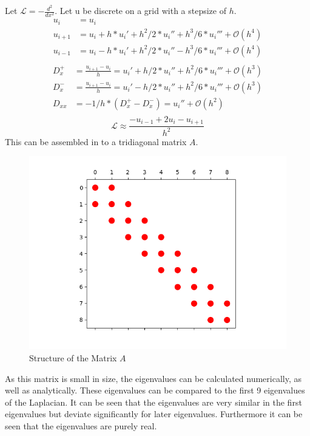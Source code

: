 \documentclass{article}
\begin{document}
Let $\mathcal{L}=-\frac{d^{2}}{d x^{2}}$. Let u be discrete on a grid with a stepsize of $h$.
\begin{align}
    u_i &= u_i\\
    u_{i+1} &= u_i + h * u_i' + h^2/2 * u_i'' + h^3/6 * u_i''' + \mathcal{O}\left(h^4\right)\\
    u_{i-1} &= u_i - h * u_i' + h^2/2 * u_i'' - h^3/6 * u_i''' + \mathcal{O}\left(h^4\right)\\
\end{align}
\begin{align}
    D_x^+ &= \frac{u_{i+1}-u_i}{h} = u_i' + h/2 * u_i'' + h^2/6 * u_i''' + \mathcal{O}\left(h^3\right)\\
    D_x^- &= \frac{u_{i+1}-u_i}{h} = u_i' - h/2 * u_i'' + h^2/6 * u_i''' + \mathcal{O}\left(h^3\right)\\
    D_{xx} &= -1/h*\left(D_x^+ - D_x^-\right) = u_i'' + \mathcal{O}\left(h^2\right)\\
\end{align}
\begin{equation}
    \mathcal{L} \approx \frac{-u_{i-1}+2u_i-u_{i+1}}{h^2}
\end{equation}
This can be assembled in to a tridiagonal matrix $A$.
\begin{figure}[H]
    \centering
    \includegraphics[width=.9\linewidth]{2spy.png}
    \caption{Structure of the Matrix $A$}
\end{figure}
As this matrix is small in size, the eigenvalues can be calculated numerically, as well as analytically. These eigenvalues can be compared to the first 9 eigenvalues of the Laplacian. It can be seen that the eigenvalues are very similar in the first eigenvalues but deviate significantly for later eigenvalues. Furthermore it can be seen that the eigenvalues are purely real.
\end{document}
